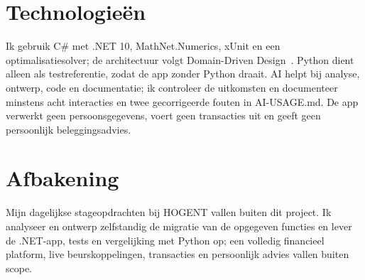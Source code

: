 
\section{Technologieën}%
\label{vst:technologieen}

%
%

Ik gebruik C\# met .NET 10, MathNet.Numerics, xUnit en een optimalisatiesolver;
de architectuur volgt Domain-Driven Design~\autocite{MathNetDocs,DotNetDocs}.
Python dient alleen als testreferentie, zodat de app zonder Python draait. AI
helpt bij analyse, ontwerp, code en documentatie; ik controleer de uitkomsten
en documenteer minstens acht interacties en twee gecorrigeerde fouten in
AI-USAGE.md. De app verwerkt geen persoonsgegevens, voert geen transacties uit
en geeft geen persoonlijk beleggingsadvies.


\section{Afbakening}%
\label{vst:afbakening}

%
%

Mijn dagelijkse stageopdrachten bij HOGENT vallen buiten dit project. Ik
analyseer en ontwerp zelfstandig de migratie van de opgegeven functies en lever
de .NET-app, tests en vergelijking met Python op; een volledig financieel
platform, live beurskoppelingen, transacties en persoonlijk advies vallen
buiten scope.


